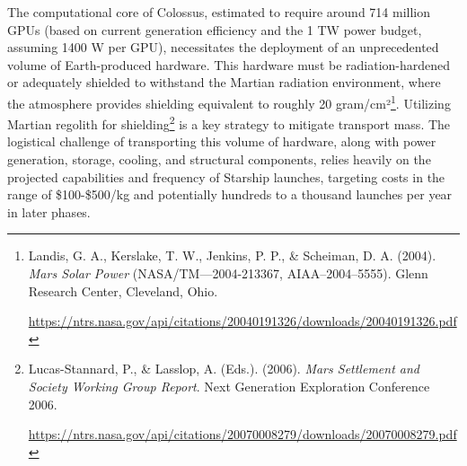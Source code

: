 \documentclass[fontsize=10pt, oneside, DIV=calc]{scrartcl}
\begin{document}
\noindent
The computational core of Colossus, estimated to require around 714 million GPUs (based on current generation efficiency and the 1 TW power budget, assuming 1400 W per GPU), necessitates the deployment of an unprecedented volume of Earth-produced hardware. This hardware must be radiation-hardened or adequately shielded to withstand the Martian radiation environment, where the atmosphere provides shielding equivalent to roughly 20 gram/cm²\footnote{Landis, G. A., Kerslake, T. W., Jenkins, P. P., \& Scheiman, D. A. (2004). \textit{Mars Solar Power} (NASA/TM—2004-213367, AIAA–2004–5555). Glenn Research Center, Cleveland, Ohio.








\href{https://ntrs.nasa.gov/api/citations/20040191326/downloads/20040191326.pdf}\url{https://ntrs.nasa.gov/api/citations/20040191326/downloads/20040191326.pdf}}. Utilizing Martian regolith for shielding\footnote{Lucas-Stannard, P., \& Lasslop, A. (Eds.). (2006). \textit{Mars Settlement and Society Working Group Report}. Next Generation Exploration Conference 2006.








\href{https://ntrs.nasa.gov/api/citations/20070008279/downloads/20070008279.pdf}\url{https://ntrs.nasa.gov/api/citations/20070008279/downloads/20070008279.pdf}} is a key strategy to mitigate transport mass. The logistical challenge of transporting this volume of hardware, along with power generation, storage, cooling, and structural components, relies heavily on the projected capabilities and frequency of Starship launches, targeting costs in the range of \$100-\$500/kg and potentially hundreds to a thousand launches per year in later phases.

\medskip
\end{document}
